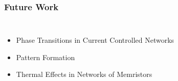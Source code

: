 \documentclass[mathserif]{beamer}
\begin{document}
\begin{frame}
\frametitle{Future Work}
\begin{columns}
\begin{itemize}
\item<1-> Phase Transitions in Current Controlled Networks
\item<2-> Pattern Formation
\item<3-> Thermal Effects in Networks of Memristors
\end{itemize}
\begin{center}



\end{center}
\end{columns}
\end{frame}
\end{document}
